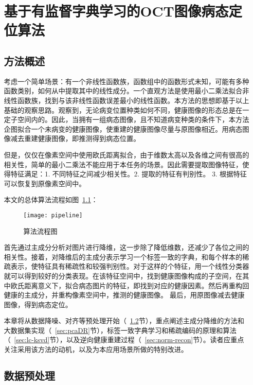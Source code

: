 \chapter{基于有监督字典学习的OCT图像病态定位算法}

\section{方法概述} %
\label{sec:methodOverview}

    考虑一个简单场景：有一个非线性函数族，函数组中的函数形式未知，可能有多种函数类别，如何从中提取其中的线性成分。一个直观方法是使用最小二乘法拟合非线性函数族，找到与该非线性函数误差最小的线性函数。本方法的思想即基于以上基础的观察思路。观察到，无论病变位置种类如何不同，健康图像的形态总是在一定子空间内的。因此，当拥有一组病态图像，且不知道病变种类的条件下，本方法企图拟合一个未病变的健康图像，使重建的健康图像尽量与原图像相近。用病态图像减去重建健康图像，即推测得到病态位置。

    但是，仅仅在像素空间中使用欧氏距离拟合，由于维数太高以及各维之间有很高的相关性，简单的最小二乘法不能应用于本任务的场景。因此需要提取图像特征，使得特征满足：1. 不同特征之间减少相关性。2. 提取的特征有判别性。 3. 根据特征可以恢复到原像素空间中。 

    本文的总体算法流程如图~\ref{fig:pipeline}：
    \begin{figure} %
      \centering
      \texttt{[image: pipeline]}
      \caption{算法流程图}
      \label{fig:pipeline}
    \end{figure}
    首先通过主成分分析对图片进行降维，这一步除了降低维数，还减少了各位之间的相关性。接着，对降维后的主成分表示学习一个标签一致的字典，和每个样本的稀疏表示，使特征具有稀疏性和较强判别性。对于这样的个特征，用一个线性分类器就可以得到较好的分类表现。在该特征空间中，找到健康图像构成的子空间，在其中欧氏距离意义下，拟合病态图片的特征，即找到对应的健康因素。然后再重构回健康的主成分，并重构像素空间中，推测的健康图像。 最后，用原图像减去健康图像，得到病态定位。

    本章将从数据降噪、对齐等预处理开始（~\ref{sec:Preprocessing}节），重点阐述主成分降维的方法和大数据集实现（~\ref{sec:pcaDR}节），标签一致字典学习和稀疏编码的原理和算法（~\ref{sec:lc-ksvd}节），以及逆向健康重建过程（~\ref{sec:norm-recon}节）。读者应重点关注采用该方法的动机，以及为本应用场景所做的特别改进。



\section{数据预处理}
\label{sec:Preprocessing}


